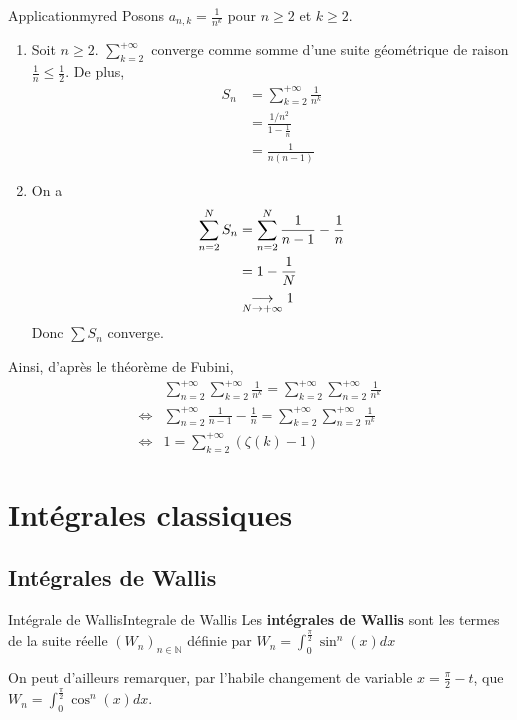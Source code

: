     \begin{omed}{Application}{myred}
        Posons $a_{n,k} = \frac{1}{n^k}$ pour $n \geq 2$ et $k \geq 2$.
        \begin{enumerate}[label=(\textit{\alph*})]
            \item Soit $n \geq 2$. $\sum_{k=2}^{+\infty}$ converge comme somme d’une suite géométrique de raison $\frac{1}{n} \leq \frac{1}{2}$. De plus, 
            \begin{align*}
                S_n 
                &= \sum_{k=2}^{+\infty} \frac{1}{n^k} \\
                &= \frac{1 / n^2}{1 - \frac{1}{n}} \\
                &= \frac{1}{n(n-1)}
            \end{align*}
            \item On a 
            \begin{align*}
                \sum_{n=2}^{N} S_n 
                &= \sum_{n=2}^{N} \frac{1}{n-1} - \frac{1}{n} \\
                &= 1 - \frac{1}{N} \\
                &\underset{N \rightarrow +\infty}{\longrightarrow} 1
            \end{align*}
            Donc $\sum S_n$ converge.
        \end{enumerate}
        Ainsi, d’après le théorème de Fubini, 
        \begin{align*}
            &\sum_{n = 2}^{+\infty} \sum_{k=2}^{+\infty} \frac{1}{n^k} = \sum_{k=2}^{+\infty} \sum_{n = 2}^{+\infty} \frac{1}{n^k} \\
            \iff & \sum_{n=2}^{+\infty} \frac{1}{n-1} - \frac{1}{n} = \sum_{k=2}^{+\infty} \sum_{n = 2}^{+\infty} \frac{1}{n^k} \\
            \iff & 1 = \sum_{k=2}^{+\infty} \left(\zeta(k) - 1\right) 
        \end{align*}
    \end{omed}

\newpage

\section{Intégrales classiques}

\subsection{Intégrales de Wallis}

    \begin{defi}{Intégrale de Wallis}{Integrale de Wallis}
        Les \textbf{intégrales de Wallis} sont les termes de la suite réelle $(W_n)_{n \in \mathbb{N}}$ définie par $W_n = \int_{0}^{\frac{\pi}{2}} \sin^n(x)dx$
        
        On peut d’ailleurs remarquer, par l’habile changement de variable $x = \frac{\pi}{2} - t$, que $W_n = \int_{0}^{\frac{\pi}{2}} \cos^n(x)dx$.
    \end{defi}

